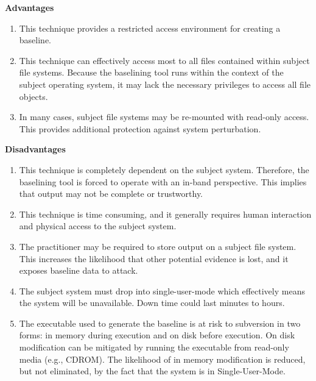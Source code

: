 \documentclass[10pt]{article}
\begin{document}
  \textbf{Advantages}

\begin{enumerate}

  \item
  This technique provides a restricted access environment for creating
  a baseline.

  \item
  This technique can effectively access most to all files contained
  within subject file systems.  Because the baselining tool runs
  within the context of the subject operating system, it may lack the
  necessary privileges to access all file objects.

  \item
  In many cases, subject file systems may be re-mounted with read-only
  access.  This provides additional protection against system
  perturbation.

\end{enumerate}

  \textbf{Disadvantages}

\begin{enumerate}

  \item
  This technique is completely dependent on the subject system.
  Therefore, the baselining tool is forced to operate with an in-band
  perspective.  This implies that output may not be complete or
  trustworthy.

  \item
  This technique is time consuming, and it generally requires human
  interaction and physical access to the subject system.

  \item
  The practitioner may be required to store output on a subject file
  system.  This increases the likelihood that other potential evidence
  is lost, and it exposes baseline data to attack.

  \item
  The subject system must drop into single-user-mode which effectively
  means the system will be unavailable.  Down time could last minutes
  to hours.

  \item
  The executable used to generate the baseline is at risk to
  subversion in two forms: in memory during execution and on disk
  before execution.  On disk modification can be mitigated by running
  the executable from read-only media (e.g., CDROM).  The likelihood
  of in memory modification is reduced, but not eliminated, by the
  fact that the system is in Single-User-Mode.

\end{enumerate}
\end{document}
